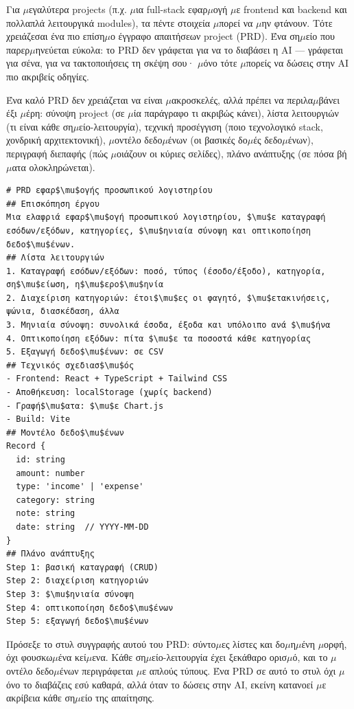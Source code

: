 
Για $\mu$εγαλύτερα projects (π.χ. $\mu$ια full-stack εφαρ$\mu$ογή $\mu$ε frontend και backend και πολλαπλά λειτουργικά modules), τα πέντε στοιχεία $\mu$πορεί να $\mu$ην φτάνουν. Τότε χρειάζεσαι ένα πιο επίση$\mu$ο έγγραφο απαιτήσεων project (PRD). Ένα ση$\mu$είο που παρερ$\mu$ηνεύεται εύκολα: το PRD δεν γράφεται για να το διαβάσει η AI — γράφεται για σένα, για να τακτοποιήσεις τη σκέψη σου· $\mu$όνο τότε $\mu$πορείς να δώσεις στην AI πιο ακριβείς οδηγίες.

Ένα καλό PRD δεν χρειάζεται να είναι $\mu$ακροσκελές, αλλά πρέπει να περιλα$\mu$βάνει έξι $\mu$έρη: σύνοψη project (σε $\mu$ία παράγραφο τι ακριβώς κάνει), λίστα λειτουργιών (τι είναι κάθε ση$\mu$είο-λειτουργία), τεχνική προσέγγιση (ποιο τεχνολογικό stack, χονδρική αρχιτεκτονική), $\mu$οντέλο δεδο$\mu$ένων (οι βασικές δο$\mu$ές δεδο$\mu$ένων), περιγραφή διεπαφής (πώς $\mu$οιάζουν οι κύριες σελίδες), πλάνο ανάπτυξης (σε πόσα βή$\mu$ατα ολοκληρώνεται).

\begin{lstlisting}
# PRD εφαρ$\mu$ογής προσωπικού λογιστηρίου
## Επισκόπηση έργου
Μια ελαφριά εφαρ$\mu$ογή προσωπικού λογιστηρίου, $\mu$ε καταγραφή εσόδων/εξόδων, κατηγορίες, $\mu$ηνιαία σύνοψη και οπτικοποίηση δεδο$\mu$ένων.
## Λίστα λειτουργιών
1. Καταγραφή εσόδων/εξόδων: ποσό, τύπος (έσοδο/έξοδο), κατηγορία, ση$\mu$είωση, η$\mu$ερο$\mu$ηνία
2. Διαχείριση κατηγοριών: έτοι$\mu$ες οι φαγητό, $\mu$ετακινήσεις, ψώνια, διασκέδαση, άλλα
3. Μηνιαία σύνοψη: συνολικά έσοδα, έξοδα και υπόλοιπο ανά $\mu$ήνα
4. Οπτικοποίηση εξόδων: πίτα $\mu$ε τα ποσοστά κάθε κατηγορίας
5. Εξαγωγή δεδο$\mu$ένων: σε CSV
## Τεχνικός σχεδιασ$\mu$ός
- Frontend: React + TypeScript + Tailwind CSS
- Αποθήκευση: localStorage (χωρίς backend)
- Γραφή$\mu$ατα: $\mu$ε Chart.js
- Build: Vite
## Μοντέλο δεδο$\mu$ένων
Record {
  id: string
  amount: number
  type: 'income' | 'expense'
  category: string
  note: string
  date: string  // YYYY-MM-DD
}
## Πλάνο ανάπτυξης
Step 1: βασική καταγραφή (CRUD)
Step 2: διαχείριση κατηγοριών
Step 3: $\mu$ηνιαία σύνοψη
Step 4: οπτικοποίηση δεδο$\mu$ένων
Step 5: εξαγωγή δεδο$\mu$ένων
\end{lstlisting}

Πρόσεξε το στυλ συγγραφής αυτού του PRD: σύντο$\mu$ες λίστες και δο$\mu$η$\mu$ένη $\mu$ορφή, όχι φουσκω$\mu$ένα κεί$\mu$ενα. Κάθε ση$\mu$είο-λειτουργία έχει ξεκάθαρο ορισ$\mu$ό, και το $\mu$οντέλο δεδο$\mu$ένων περιγράφεται $\mu$ε απλούς τύπους. Ένα PRD σε αυτό το στυλ όχι $\mu$όνο το διαβάζεις εσύ καθαρά, αλλά όταν το δώσεις στην AI, εκείνη κατανοεί $\mu$ε ακρίβεια κάθε ση$\mu$είο της απαίτησης.

